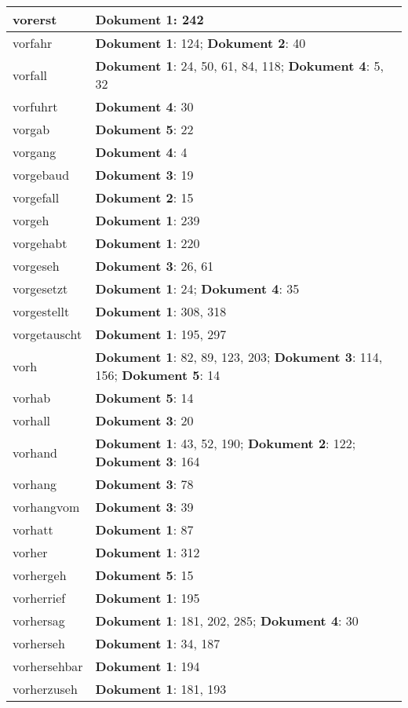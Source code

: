 \documentclass[a5paper]{article}
\begin{document}
\begin{longtable}[l]{|l|p{3in}|}
\hline
vorerst & \textbf{Dokument 1}: 242 \\
\hline
vorfahr & \textbf{Dokument 1}: 124; \textbf{Dokument 2}: 40 \\
\hline
vorfall & \textbf{Dokument 1}: 24, 50, 61, 84, 118; \textbf{Dokument 4}: 5, 32 \\
\hline
vorfuhrt & \textbf{Dokument 4}: 30 \\
\hline
vorgab & \textbf{Dokument 5}: 22 \\
\hline
vorgang & \textbf{Dokument 4}: 4 \\
\hline
vorgebaud & \textbf{Dokument 3}: 19 \\
\hline
vorgefall & \textbf{Dokument 2}: 15 \\
\hline
vorgeh & \textbf{Dokument 1}: 239 \\
\hline
vorgehabt & \textbf{Dokument 1}: 220 \\
\hline
vorgeseh & \textbf{Dokument 3}: 26, 61 \\
\hline
vorgesetzt & \textbf{Dokument 1}: 24; \textbf{Dokument 4}: 35 \\
\hline
vorgestellt & \textbf{Dokument 1}: 308, 318 \\
\hline
vorgetauscht & \textbf{Dokument 1}: 195, 297 \\
\hline
vorh & \textbf{Dokument 1}: 82, 89, 123, 203; \textbf{Dokument 3}: 114, 156; \textbf{Dokument 5}: 14 \\
\hline
vorhab & \textbf{Dokument 5}: 14 \\
\hline
vorhall & \textbf{Dokument 3}: 20 \\
\hline
vorhand & \textbf{Dokument 1}: 43, 52, 190; \textbf{Dokument 2}: 122; \textbf{Dokument 3}: 164 \\
\hline
vorhang & \textbf{Dokument 3}: 78 \\
\hline
vorhangvom & \textbf{Dokument 3}: 39 \\
\hline
vorhatt & \textbf{Dokument 1}: 87 \\
\hline
vorher & \textbf{Dokument 1}: 312 \\
\hline
vorhergeh & \textbf{Dokument 5}: 15 \\
\hline
vorherrief & \textbf{Dokument 1}: 195 \\
\hline
vorhersag & \textbf{Dokument 1}: 181, 202, 285; \textbf{Dokument 4}: 30 \\
\hline
vorherseh & \textbf{Dokument 1}: 34, 187 \\
\hline
vorhersehbar & \textbf{Dokument 1}: 194 \\
\hline
vorherzuseh & \textbf{Dokument 1}: 181, 193 \\

\end{longtable}
\end{document}
